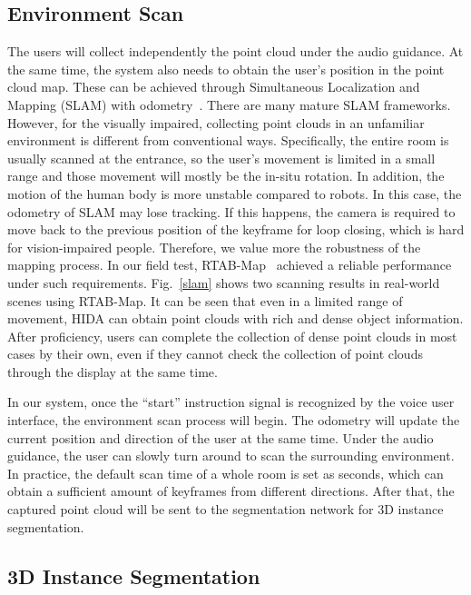 \documentclass[10pt,twocolumn,letterpaper]{article}
\begin{document}
\subsection{Environment Scan}
The users will collect independently the point cloud under the audio guidance. At the same time, the system also needs to obtain the user's position in the point cloud map. These can be achieved through Simultaneous Localization and Mapping (SLAM) with odometry~\cite{chen2021panoramic,labbe2019rtab,wang2021lightweight}. There are many mature SLAM frameworks. However, for the visually impaired, collecting point clouds in an unfamiliar environment is different from conventional ways. Specifically, the entire room is usually scanned at the entrance, so the user's movement is limited in a small range and those movement will mostly be the in-situ rotation. In addition, the motion of the human body is more unstable compared to robots. In this case, the odometry of SLAM may lose tracking. If this happens, the camera is required to move back to the previous position of the keyframe for loop closing, which is hard for vision-impaired people. Therefore, we value more the robustness of the mapping process. In our field test, RTAB-Map~\cite{labbe2019rtab} achieved a reliable performance under such requirements. Fig.~\ref{slam} shows two scanning results in real-world scenes using RTAB-Map. It can be seen that even in a limited range of movement, HIDA can obtain point clouds with rich and dense object information. After proficiency, users can complete the collection of dense point clouds in most cases by their own, even if they cannot check the collection of point clouds through the display at the same time.

In our system, once the ``start'' instruction signal is recognized by the voice user interface, the environment scan process will begin. The odometry will update the current position and direction of the user at the same time. Under the audio guidance, the user can slowly turn around to scan the surrounding environment. In practice, the default scan time of a whole room is set as  seconds, which can obtain a sufficient amount of keyframes from different directions. After that, the captured point cloud will be sent to the segmentation network for 3D instance segmentation.

\subsection{3D Instance Segmentation}
\end{document}
